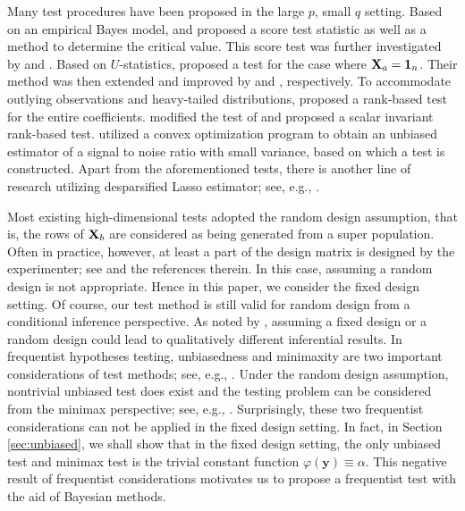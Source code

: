 \documentclass[smallextended]{svjour3}       %
\newcommand{\By}{\mathbf{y}}    \newcommand{\Bz}{\mathbf{z}}
\begin{document}
Many test procedures have been proposed in the large $p$, small $q$ setting.
Based on an empirical Bayes model, \cite{Goeman2006} and \cite{Goeman2011} proposed a score test statistic as well as a method to determine the critical value.
This score test was further investigated by \cite{Lan2014Testing} and \cite{Lan2016a}.
Based on $U$-statistics, \cite{Zhong2011Tests} proposed a test for the case where $\mathbf{X}_a=\mathbf 1_n$.
Their method was then extended and improved by \cite{Wang2015} and \cite{Cui2018}, respectively.
To accommodate outlying observations and heavy-tailed distributions, \cite{Feng2013}
proposed a rank-based test for the entire coefficients.
\cite{Xu2016a} modified the test of \cite{Feng2013} and proposed a scalar invariant rank-based test.
\cite{Janson2016} utilized a convex optimization program to obtain an unbiased estimator of a signal to noise ratio with small variance, based on which a test is constructed.
Apart from the aforementioned tests,
there is another line of research utilizing desparsified Lasso estimator; see, e.g., \cite{Dezeure2017} \cite{ZC2017}.

Most existing high-dimensional tests adopted the random design assumption, that is, the rows of $\mathbf{X}_b$ are considered as being generated from a super population.
Often in practice, however, at least a part of the design matrix is designed by the experimenter; see \cite{Draper1996} and the references therein.
In this case, assuming a random design is not appropriate.
Hence in this paper, we consider the fixed design setting.
Of course, our test method is still valid for random design from a conditional inference perspective.
As noted by \cite{Lei2018}, assuming a fixed design or a random design could lead to qualitatively different inferential results.
In frequentist hypotheses testing,
unbiasedness and minimaxity are two important considerations of test methods; see, e.g., \cite{Lehmann}.
Under the random design assumption, nontrivial unbiased test does exist and the testing problem can be considered from the minimax perspective; see, e.g., \cite{ITV2010}.
Surprisingly, these two frequentist considerations can not be applied in the fixed design setting.
In fact, in Section \ref{sec:unbiased}, we shall show that in the fixed design setting, the only unbiased test and minimax test is the trivial constant function $\varphi(\By) \equiv \alpha$.
This negative result of frequentist considerations motivates us to propose a frequentist test with the aid of Bayesian methods.
\end{document}
